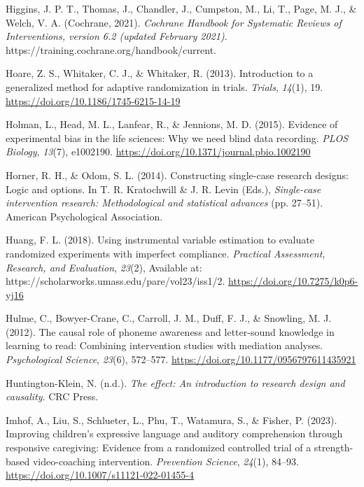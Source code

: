 \documentclass{krantz}
\newlength{\cslhangindent}
\newlength{\cslentryspacingunit} %
\newenvironment{CSLReferences}[2] %
{%
\setlength{\parindent}{0pt}
\ifodd #1
\let\oldpar\par
\def\par{\hangindent=\cslhangindent\oldpar}
\fi
\setlength{\parskip}{#2\cslentryspacingunit}
}%
{}
\begin{document}
\begin{CSLReferences}{1}{0}
\leavevmode{}%
Higgins, J. P. T., Thomas, J., Chandler, J., Cumpston, M., Li, T., Page, M. J., \& Welch, V. A. (Cochrane, 2021). \emph{Cochrane {Handbook} for {Systematic Reviews} of {Interventions}, version 6.2 (updated {February} 2021)}. https://training.cochrane.org/handbook/current.

\leavevmode{}%
Hoare, Z. S., Whitaker, C. J., \& Whitaker, R. (2013). Introduction to a generalized method for adaptive randomization in trials. \emph{Trials}, \emph{14}(1), 19. \url{https://doi.org/10.1186/1745-6215-14-19}

\leavevmode{}%
Holman, L., Head, M. L., Lanfear, R., \& Jennions, M. D. (2015). Evidence of experimental bias in the life sciences: {Why} we need blind data recording. \emph{PLOS Biology}, \emph{13}(7), e1002190. \url{https://doi.org/10.1371/journal.pbio.1002190}

\leavevmode{}%
Horner, R. H., \& Odom, S. L. (2014). Constructing single-case research designs: {Logic} and options. In T. R. Kratochwill \& J. R. Levin (Eds.), \emph{Single-case intervention research: {Methodological} and statistical advances} (pp. 27--51). {American Psychological Association}.

\leavevmode{}%
Huang, F. L. (2018). Using instrumental variable estimation to evaluate randomized experiments with imperfect compliance. \emph{Practical Assessment, Research, and Evaluation}, \emph{23}(2), Available at: https://scholarworks.umass.edu/pare/vol23/iss1/2. \url{https://doi.org/10.7275/k0p6-yj16}

\leavevmode{}%
Hulme, C., Bowyer-Crane, C., Carroll, J. M., Duff, F. J., \& Snowling, M. J. (2012). The causal role of phoneme awareness and letter-sound knowledge in learning to read: Combining intervention studies with mediation analyses. \emph{Psychological Science}, \emph{23}(6), 572--577. \url{https://doi.org/10.1177/0956797611435921}

\leavevmode{}%
Huntington-Klein, N. (n.d.). \emph{The effect: An introduction to research design and causality}. {CRC Press}.

\leavevmode{}%
Imhof, A., Liu, S., Schlueter, L., Phu, T., Watamura, S., \& Fisher, P. (2023). Improving children's expressive language and auditory comprehension through responsive caregiving: Evidence from a randomized controlled trial of a strength-based video-coaching intervention. \emph{Prevention Science}, \emph{24}(1), 84--93. \url{https://doi.org/10.1007/s11121-022-01455-4}


\end{CSLReferences}
\end{document}
